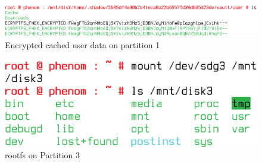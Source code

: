 \documentclass[11pt]{article}
\begin{document}
\begin{figure}[htbp]
  \centering
    \includegraphics[scale=0.25]{Figure/verified-image-part1-encrypted-files.eps}
\caption{\small{Encrypted cached user data on partition 1}}
\label{fig:verified-image-part1-encrypted-files}
\end{figure}

\begin{figure}[htbp]
  \centering
    \includegraphics[scale=0.3]{Figure/part3-noverify-success.eps}
\caption{\small{rootfs on Partition 3}}
\label{fig:part3-noverify-success}
\end{figure}
\end{document}
